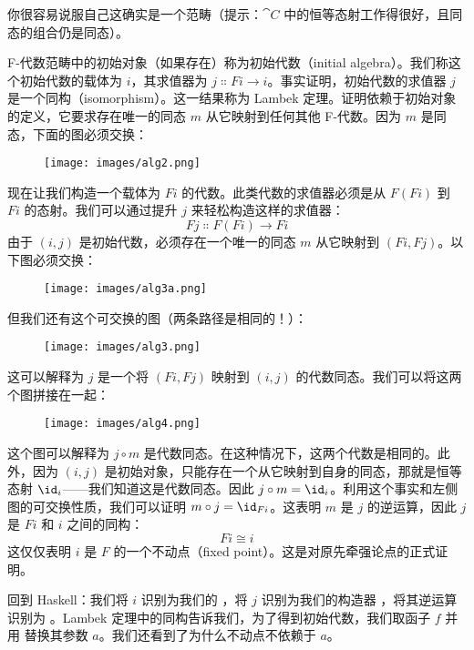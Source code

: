 \noindent
你很容易说服自己这确实是一个范畴（提示：$\cat{C}$ 中的恒等态射工作得很好，且同态的组合仍是同态）。

F-代数范畴中的初始对象（如果存在）称为初始代数（initial algebra）。我们称这个初始代数的载体为 $i$，其求值器为 $j \Colon F i \to i$。事实证明，初始代数的求值器 $j$ 是一个同构（isomorphism）。这一结果称为 Lambek 定理。证明依赖于初始对象的定义，它要求存在唯一的同态 $m$ 从它映射到任何其他 F-代数。因为 $m$ 是同态，下面的图必须交换：

\begin{figure}[H]
  \centering
  \texttt{[image: images/alg2.png]}
\end{figure}

\noindent
现在让我们构造一个载体为 $F i$ 的代数。此类代数的求值器必须是从 $F (F i)$ 到 $F i$ 的态射。我们可以通过提升 $j$ 来轻松构造这样的求值器：
\[F j \Colon F (F i) \to F i\]
由于 $(i, j)$ 是初始代数，必须存在一个唯一的同态 $m$ 从它映射到 $(F i, F j)$。以下图必须交换：

\begin{figure}[H]
  \centering
  \texttt{[image: images/alg3a.png]}
\end{figure}

\noindent
但我们还有这个可交换的图（两条路径是相同的！）：

\begin{figure}[H]
  \centering
  \texttt{[image: images/alg3.png]}
\end{figure}

\noindent
这可以解释为 $j$ 是一个将 $(F i, F j)$ 映射到 $(i, j)$ 的代数同态。我们可以将这两个图拼接在一起：

\begin{figure}[H]
  \centering
  \texttt{[image: images/alg4.png]}
\end{figure}

\noindent
这个图可以解释为 $j \circ m$ 是代数同态。在这种情况下，这两个代数是相同的。此外，因为 $(i, j)$ 是初始对象，只能存在一个从它映射到自身的同态，那就是恒等态射 $\id_i$——我们知道这是代数同态。因此 $j \circ m = \id_i$。利用这个事实和左侧图的可交换性质，我们可以证明 $m \circ j = \id_{Fi}$。这表明 $m$ 是 $j$ 的逆运算，因此 $j$ 是 $F i$ 和 $i$ 之间的同构：
\[F i \cong i\]
这仅仅表明 $i$ 是 $F$ 的一个不动点（fixed point）。这是对原先牵强论点的正式证明。

回到 Haskell：我们将 $i$ 识别为我们的 ，将 $j$ 识别为我们的构造器 ，将其逆运算识别为 。Lambek 定理中的同构告诉我们，为了得到初始代数，我们取函子 $f$ 并用  替换其参数 $a$。我们还看到了为什么不动点不依赖于 $a$。

